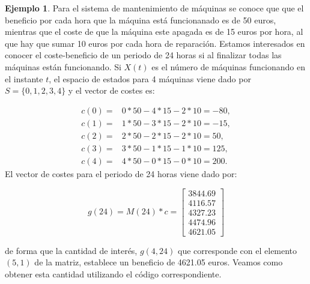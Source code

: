 \documentclass[
]{book}
\theoremstyle{definition}
\theoremstyle{definition}
\newtheorem{example}{Ejemplo}[chapter]
\theoremstyle{definition}
\theoremstyle{definition}
\theoremstyle{remark}
\begin{document}
\begin{example}
Para el sistema de mantenimiento de máquinas se conoce que que el beneficio por cada hora que la máquina está funcionanado es de 50 euros, mientras que el coste de que la máquina este apagada es de 15 euros por hora, al que hay que sumar 10 euros por cada hora de reparación. Estamos interesados en conocer el coste-beneficio de un periodo de 24 horas si al finalizar todas las máquinas están funcionando. Si \(X(t)\) es el número de máquinas funcionando en el instante \(t\), el espacio de estados para 4 máquinas viene dado por \(S = \{0, 1, 2, 3, 4\}\) y el vector de costes es:
\end{example}

\[
\begin{matrix}
c(0) = & 0*50 - 4*15 - 2*10 = - 80,\\
c(1) = & 1*50 - 3*15 - 2*10 = - 15,\\
c(2) = & 2*50 - 2*15 - 2*10 = 50,\\
c(3) = & 3*50 - 1*15 - 1*10 = 125,\\
c(4) = & 4*50 - 0*15 - 0*10 = 200.
\end{matrix}
\] El vector de costes para el periodo de 24 horas viene dado por:

\[
g(24) = M(24)*c =
\begin{bmatrix}
3844.69 \\
4116.57 \\
4327.23 \\
4474.96 \\
4621.05
\end{bmatrix}
\]

de forma que la cantidad de interés, \(g(4, 24)\) que corresponde con el elemento \((5,1)\) de la matriz, establece un beneficio de 4621.05 euros. Veamos como obtener esta cantidad utilizando el código correspondiente.
\end{document}
